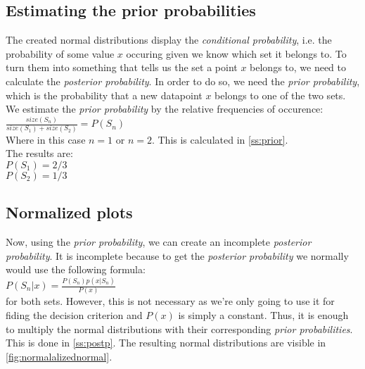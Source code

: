 \documentclass[10pt,a4paper]{article}
\begin{document}
\subsection{Estimating the prior probabilities}
The created normal distributions display the \textit{conditional probability}, i.e. the probability of some value $x$ occuring given we know which set it belongs to. To turn them into something that tells us the set a point $x$ belongs to, we need to calculate the \textit{posterior probability}. In order to do so, we need the \textit{prior probability}, which is the probability that a new datapoint $x$ belongs to one of the two sets. We estimate the \textit{prior probability} by the relative frequencies of occurence:\\
$\frac{size(S_n)}{size(S_1) + size(S_2)} = P(S_n)$\\
Where in this case $n = 1$ or $n = 2$. This is calculated in \autoref{ss:prior}.\\
The results are:\\
$P(S_1) = 2/3$\\
$P(S_2) = 1/3$\\

\subsection{Normalized plots}
Now, using the \textit{prior probability}, we can create an incomplete  \textit{posterior probability}. It is incomplete because to get the \textit{posterior probability} we normally would use the following formula:\\
$P(S_n|x) = \frac{P(S_n)p(x|S_n)}{P(x)}$\\
for both sets. However, this is not necessary as we're only going to use it for fiding the decision criterion and $P(x)$ is simply a constant. Thus, it is enough to multiply the normal distributions with their corresponding \textit{prior probabilities}. This is done in \autoref{ss:postp}. The resulting normal distributions are visible in \autoref{fig:normalalizednormal}.
\end{document}
